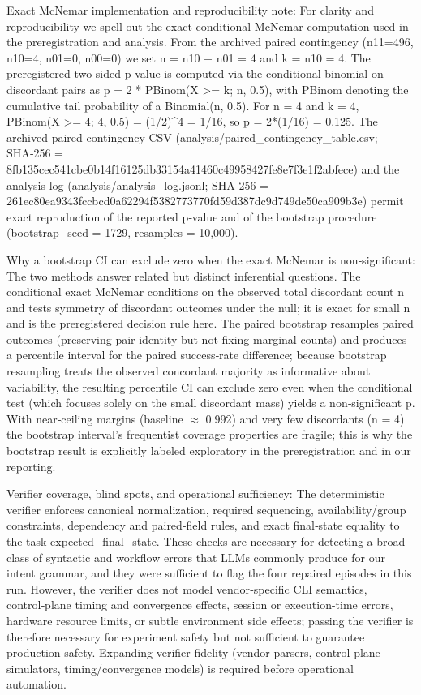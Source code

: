 \documentclass[conference]{IEEEtran}
\begin{document}
Exact McNemar implementation and reproducibility note: For clarity and reproducibility we spell out the exact conditional McNemar computation used in the preregistration and analysis. From the archived paired contingency (n11=496, n10=4, n01=0, n00=0) we set n = n10 + n01 = 4 and k = n10 = 4. The preregistered two‑sided p‑value is computed via the conditional binomial on discordant pairs as p = 2 * PBinom(X >= k; n, 0.5), with PBinom denoting the cumulative tail probability of a Binomial(n, 0.5). For n = 4 and k = 4, PBinom(X >= 4; 4, 0.5) = (1/2)\textasciicircum{}4 = 1/16, so p = 2*(1/16) = 0.125. The archived paired contingency CSV (analysis/paired\_contingency\_table.csv; SHA‑256 = 8fb135ce\allowbreak{}c541cbe0\allowbreak{}b14f1612\allowbreak{}5db33154\allowbreak{}a41460c4\allowbreak{}9958427f\allowbreak{}e8e7f3e1\allowbreak{}f2abfece) and the analysis log (analysis/analysis\_log.jsonl; SHA‑256 = 261ec80e\allowbreak{}a9343fcc\allowbreak{}bcd0a622\allowbreak{}94f53827\allowbreak{}73770fd5\allowbreak{}9d387dc9\allowbreak{}d749de50\allowbreak{}ca909b3e) permit exact reproduction of the reported p‑value and of the bootstrap procedure (bootstrap\_seed = 1729, resamples = 10,000).

Why a bootstrap CI can exclude zero when the exact McNemar is non‑significant: The two methods answer related but distinct inferential questions. The conditional exact McNemar conditions on the observed total discordant count n and tests symmetry of discordant outcomes under the null; it is exact for small n and is the preregistered decision rule here. The paired bootstrap resamples paired outcomes (preserving pair identity but not fixing marginal counts) and produces a percentile interval for the paired success‑rate difference; because bootstrap resampling treats the observed concordant majority as informative about variability, the resulting percentile CI can exclude zero even when the conditional test (which focuses solely on the small discordant mass) yields a non‑significant p. With near‑ceiling margins (baseline \ensuremath{\approx} 0.992) and very few discordants (n = 4) the bootstrap interval's frequentist coverage properties are fragile; this is why the bootstrap result is explicitly labeled exploratory in the preregistration and in our reporting.

Verifier coverage, blind spots, and operational sufficiency: The deterministic verifier enforces canonical normalization, required sequencing, availability/group constraints, dependency and paired‑field rules, and exact final‑state equality to the task expected\_final\_state. These checks are necessary for detecting a broad class of syntactic and workflow errors that LLMs commonly produce for our intent grammar, and they were sufficient to flag the four repaired episodes in this run. However, the verifier does not model vendor‑specific CLI semantics, control‑plane timing and convergence effects, session or execution-time errors, hardware resource limits, or subtle environment side effects; passing the verifier is therefore necessary for experiment safety but not sufficient to guarantee production safety. Expanding verifier fidelity (vendor parsers, control‑plane simulators, timing/convergence models) is required before operational automation.
\end{document}
